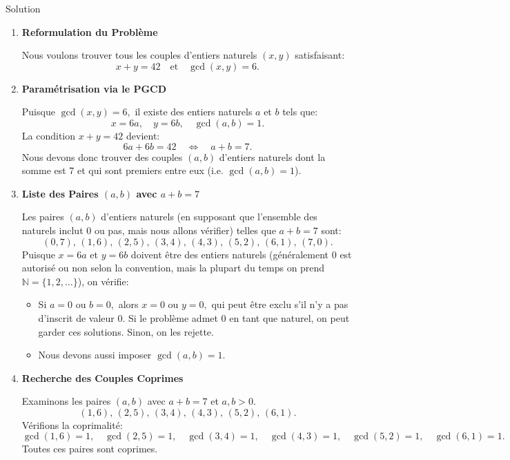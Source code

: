 \documentclass[a4paper,12pt]{article}
\begin{document}
\begin{solutionbox}{Solution}
    \begin{enumerate}
      \item \textbf{Reformulation du Problème}
    
      Nous voulons trouver tous les couples d'entiers naturels $(x,y)$ satisfaisant:
      \[
      x + y = 42
      \quad\text{et}\quad
      \gcd(x,y)=6.
      \]
    
      \item \textbf{Paramétrisation via le PGCD}
    
      Puisque $\gcd(x,y)=6,$ il existe des entiers naturels $a$ et $b$ tels que:
      \[
      x = 6a,\quad y=6b,\quad \gcd(a,b)=1.
      \]
      La condition $x + y=42$ devient:
      \[
      6a + 6b = 42 \quad\Longleftrightarrow\quad a + b = 7.
      \]
      Nous devons donc trouver des couples $(a,b)$ d'entiers naturels dont la somme est 7 et qui sont premiers entre eux (i.e. $\gcd(a,b)=1$).
    
      \item \textbf{Liste des Paires $(a,b)$ avec $a+b=7$}
    
      Les paires $(a,b)$ d'entiers naturels (en supposant que l'ensemble des naturels inclut 0 ou pas, mais nous allons vérifier) telles que $a+b=7$ sont:
      \[
      (0,7),\, (1,6),\, (2,5),\, (3,4),\, (4,3),\, (5,2),\, (6,1),\, (7,0).
      \]
      Puisque $x=6a$ et $y=6b$ doivent être des entiers naturels (généralement $0$ est autorisé ou non selon la convention, mais la plupart du temps on prend $\mathbb{N}=\{1,2,\dots\}$), on vérifie:
    
      \begin{itemize}
        \item Si $a=0$ ou $b=0,$ alors $x=0$ ou $y=0,$ qui peut être exclu s'il n'y a pas d'inscrit de valeur 0. Si le problème admet 0 en tant que naturel, on peut garder ces solutions. Sinon, on les rejette.  
        \item Nous devons aussi imposer $\gcd(a,b)=1.$
      \end{itemize}
    
      \item \textbf{Recherche des Couples Coprimes}
    
      Examinons les paires $(a,b)$ avec $a+b=7$ et $a,b>0.$
      \[
       (1,6),\,(2,5),\,(3,4),\,(4,3),\,(5,2),\,(6,1).
      \]
      Vérifions la coprimalité:
      \[
      \gcd(1,6)=1,\quad \gcd(2,5)=1,\quad \gcd(3,4)=1,\quad \gcd(4,3)=1,\quad \gcd(5,2)=1,\quad \gcd(6,1)=1.
      \]
      Toutes ces paires sont coprimes.
    

\end{enumerate}
\end{solutionbox}
\end{document}
